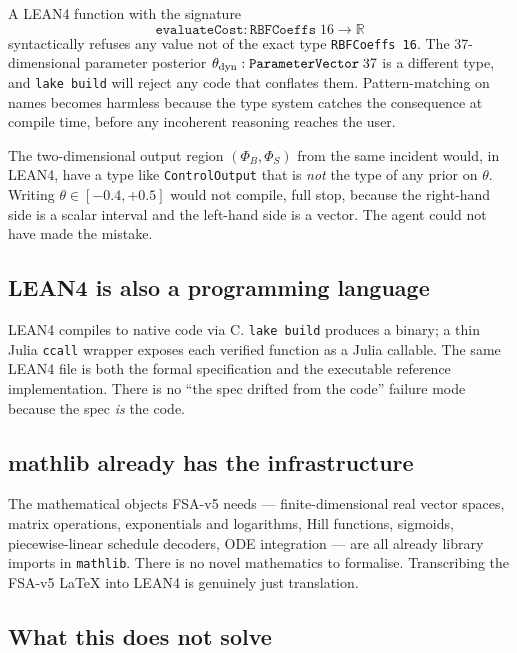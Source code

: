 \documentclass[11pt,a4paper]{article}
\begin{document}
A LEAN4 function with the signature
\[
\texttt{evaluateCost} : \texttt{RBFCoeffs}\;16 \to \mathbb{R}
\]
syntactically refuses any value not of the exact type
\texttt{RBFCoeffs 16}. The 37-dimensional parameter posterior
$\theta_{\rm dyn} : \texttt{ParameterVector}\;37$ is a different
type, and \texttt{lake build} will reject any code that conflates
them. Pattern-matching on names becomes harmless because the type
system catches the consequence at compile time, before any
incoherent reasoning reaches the user.

The two-dimensional output region $(\Phi_B, \Phi_S)$ from the
same incident would, in LEAN4, have a type like
\texttt{ControlOutput} that is \emph{not} the type of any prior on
$\theta$. Writing $\theta \in [-0.4, +0.5]$ would not compile, full
stop, because the right-hand side is a scalar interval and the
left-hand side is a vector. The agent could not have made the
mistake.

\subsection{LEAN4 is also a programming language}

LEAN4 compiles to native code via C. \texttt{lake build} produces
a binary; a thin Julia \texttt{ccall} wrapper exposes each
verified function as a Julia callable. The same LEAN4 file is
both the formal specification and the executable reference
implementation. There is no ``the spec drifted from the code''
failure mode because the spec \emph{is} the code.

\subsection{mathlib already has the infrastructure}

The mathematical objects FSA-v5 needs ---
finite-dimensional real vector spaces, matrix operations,
exponentials and logarithms, Hill functions, sigmoids,
piecewise-linear schedule decoders, ODE integration --- are all
already library imports in \texttt{mathlib}. There is no novel
mathematics to formalise. Transcribing the FSA-v5 LaTeX into LEAN4
is genuinely just translation.

\subsection{What this does not solve}
\end{document}
